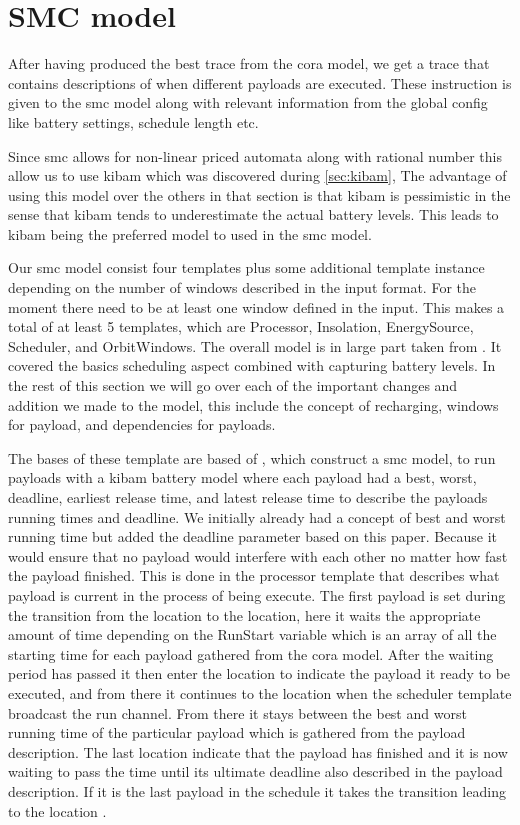 \section{SMC model} \label{sec:smc_model}
After having produced the best trace from the \gls{cora} model, we get a trace that contains descriptions of when different payloads are executed. These instruction is given to the \gls{smc} model along with relevant information from the global config like battery settings, schedule length etc.

Since \gls{smc} allows for non-linear priced automata along with rational number this allow us to use \gls{kibam} which was discovered during \cref{sec:kibam}, The advantage of using this model over the others in that section is that \gls{kibam} is pessimistic in the sense that \gls{kibam} tends to underestimate the actual battery levels. This leads to \gls{kibam} being the preferred model to used in the \gls{smc} model.

Our \gls{smc} model consist four templates plus some additional template instance depending on the number of windows described in the input format. For the moment there need to be at least one window defined in the input. This makes a total of at least 5 templates, which are Processor, Insolation, EnergySource, Scheduler, and OrbitWindows. 
The overall model is in large part taken from \cite{battery_aware_scheduling}. It covered the basics scheduling aspect combined with capturing battery levels. In the rest of this section we will go over each of the important changes and addition we made to the model, this include the concept of recharging, windows for payload, and dependencies for payloads. 

The bases of these template are based of \cite{battery_aware_scheduling}, which construct a \gls{smc} model, to run payloads with a \gls{kibam} battery model where each payload had a best, worst, deadline, earliest release time, and latest release time to describe the payloads running times and deadline. We initially already had a concept of best and worst running time but added the deadline parameter based on this paper. Because it would ensure that no payload would interfere with each other no matter how fast the payload finished. This is done in the processor template that describes what payload is current in the process of being execute. The first payload is set during the transition from the  location to the  location, here it waits the appropriate amount of time depending on the RunStart variable which is an array of all the starting time for each payload gathered from the \gls{cora} model. After the waiting period has passed it then enter the  location to indicate the payload it ready to be executed, and from there it continues to the  location when the scheduler template broadcast the run channel. From there it stays between the best and worst running time of the particular payload which is gathered from the payload description. The last location  indicate that the payload has finished and it is now waiting to pass the time until its ultimate deadline also described in the payload description. If it is the last payload in the schedule it takes the transition leading to the location .

